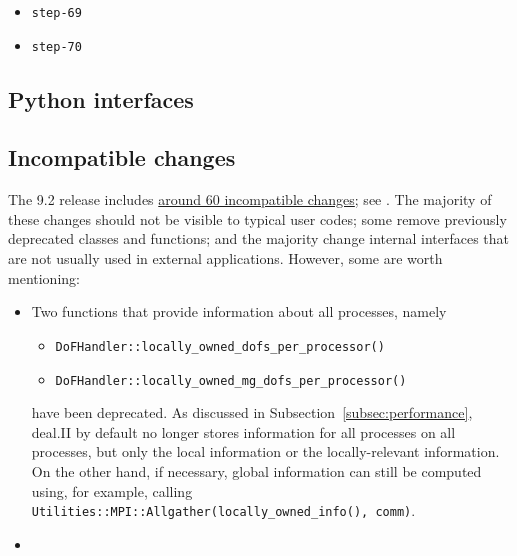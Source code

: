 \documentclass{ansarticle-preprint}
\begin{document}
\begin{itemize}
\item \texttt{step-69}

\item \texttt{step-70}
\end{itemize}


\subsection{Python interfaces}
\label{subsec:python}





\subsection{Incompatible changes}

The 9.2 release includes
\href{https://dealii.org/developer/doxygen/deal.II/changes_between_9_1_1_and_9_2_0.html}
     {around 60 incompatible changes}; see \cite{changes92}. The majority of these changes
should not be visible to typical user codes; some remove previously
deprecated classes and functions; and the majority change internal
interfaces that are not usually used in external
applications. However, some are worth mentioning:
\begin{itemize}
\item Two functions that provide information about all processes,
  namely
  \begin{itemize}
 \item \texttt{DoFHandler::locally\_owned\_dofs\_per\_processor()}
 \item \texttt{DoFHandler::locally\_owned\_mg\_dofs\_per\_processor()}
  \end{itemize}
have been deprecated. As discussed in
Subsection~\ref{subsec:performance}, deal.II by default no longer
stores information for all processes on all processes, but only the
local information or the locally-relevant information. On the other
hand, if necessary, global information can still be computed using,
for example, calling \texttt{Utilities::MPI::Allgather(locally\_owned\_info(), comm)}.
\item
\end{itemize}
\end{document}

